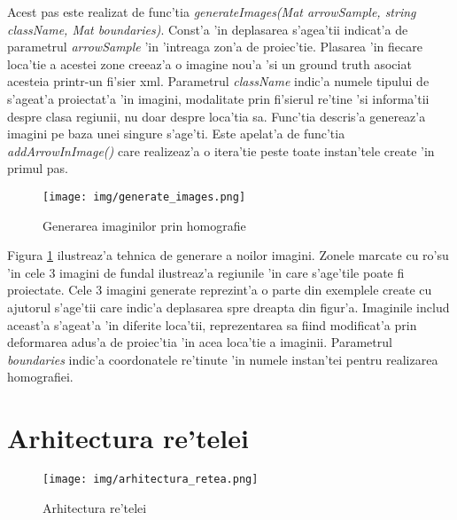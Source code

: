 \documentclass[12pt,a4paper,twoside]{report}
\begin{document}
\begin{enumerate}
Acest pas este realizat de func'tia \textit{generateImages(Mat arrowSample, string className, Mat boundaries)}. Const'a 'in deplasarea  s'agea'tii indicat'a de parametrul \textit{arrowSample} 'in 'intreaga zon'a de proiec'tie. Plasarea 'in fiecare loca'tie a acestei zone creeaz'a o imagine nou'a 'si un ground truth asociat acesteia printr-un fi'sier xml. Parametrul \textit{className} indic'a numele tipului de s'ageat'a proiectat'a 'in imagini, modalitate prin fi'sierul re'tine 'si informa'tii despre clasa regiunii, nu doar despre loca'tia sa. Func'tia descris'a genereaz'a imagini pe baza unei singure s'age'ti. Este apelat'a de func'tia \textit{addArrowInImage()} care realizeaz'a o itera'tie peste toate instan'tele create 'in primul pas.

\end{enumerate}  

\begin{figure}[H]
  \texttt{[image: img/generate\_images.png]}
  \centering
  \caption{Generarea imaginilor prin homografie}
  \label{fig:generate_images}
\end{figure}

Figura \ref{fig:generate_images} ilustreaz'a tehnica de generare a noilor imagini. Zonele marcate cu ro'su 'in cele 3 imagini de fundal ilustreaz'a regiunile 'in care s'age'tile poate fi proiectate. Cele 3 imagini generate reprezint'a o parte din exemplele create cu ajutorul s'age'tii care indic'a deplasarea spre dreapta din figur'a. Imaginile includ aceast'a s'ageat'a 'in diferite loca'tii, reprezentarea sa fiind modificat'a prin deformarea adus'a de proiec'tia 'in acea loca'tie a imaginii. Parametrul \textit{boundaries} indic'a coordonatele re'tinute 'in numele instan'tei pentru realizarea homografiei.


\section{Arhitectura re'telei}
\begin{figure}[H]
  \centering
  \texttt{[image: img/arhitectura\_retea.png]}
  \caption{Arhitectura re'telei}
  \label{fig:arhitectura_retea}
\end{figure}
\end{document}
